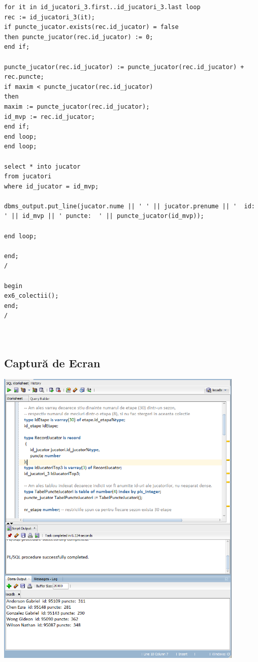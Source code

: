 \documentclass{article}
\begin{document}
\begin{lstlisting}
for it in id_jucatori_3.first..id_jucatori_3.last loop
rec := id_jucatori_3(it);
if puncte_jucator.exists(rec.id_jucator) = false
then puncte_jucator(rec.id_jucator) := 0;
end if;

puncte_jucator(rec.id_jucator) := puncte_jucator(rec.id_jucator) + rec.puncte;
if maxim < puncte_jucator(rec.id_jucator)
then
maxim := puncte_jucator(rec.id_jucator);
id_mvp := rec.id_jucator;
end if;
end loop;
end loop;

select * into jucator
from jucatori
where id_jucator = id_mvp;

dbms_output.put_line(jucator.nume || ' ' || jucator.prenume || '  id: ' || id_mvp || ' puncte:  ' || puncte_jucator(id_mvp));

end loop;

end;
/

begin
ex6_colectii();
end;
/



\end{lstlisting}

\subsection {Captură de Ecran}
\includegraphics[width=32em,keepaspectratio]{rez_colectii}
\pagebreak
\end{document}
